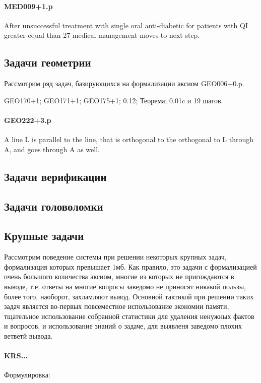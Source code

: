 \paragraph{MED009+1.p}
After unsuccessful treatment with single oral anti-diabetic for patients with QI greater equal than 27 medical management moves to next step.

\subsection{Задачи геометрии}
Рассмотрим ряд задач, базирующихся на формализации аксиом  GEO006+0.p.

GEO170+1;
GEO171+1;
GEO175+1; 0.12; Теорема; 0.01c и 19 шагов.

\paragraph{GEO222+3.p}
A line L is parallel to the line, that is orthogonal to the orthogonal to L through A, and goes through A as well.



\subsection{Задачи верификации}

\subsection{Задачи головоломки}

\subsection{Крупные задачи}
Рассмотрим поведение системы при решении некоторых крупных задач, формализация которых превышает 1мб. Как правило, это задачи с формализацией очень большого количества аксиом, многие из которых не пригождаются в выводе, т.е. ответы на многие вопросы заведомо не приносят никакой пользы, более того, наоборот, захламляют вывод. Основной тактикой при решении таких задач является во-первых повсеместное использование экономии памяти, тщательное использование собранной статистики для удаления ненужных фактов и вопросов, и использование знаний о задаче, для выявленя заведомо плохих ветветй вывода.

\paragraph{KRS...}
Формулировка:

